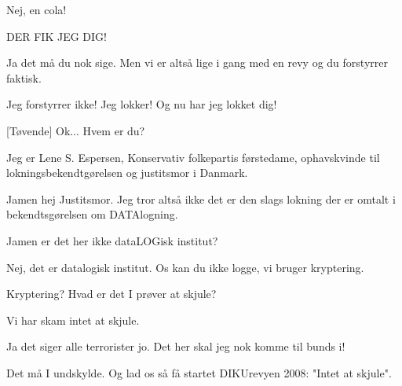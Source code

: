\documentclass[a4paper,11pt]{article}
\begin{document}
\begin{sketch}

 Nej, en cola! 


 DER FIK JEG DIG!

 Ja det må du nok sige. Men vi er altså lige i gang med en revy og du forstyrrer faktisk.

 Jeg forstyrrer ikke! Jeg lokker! Og nu har jeg lokket dig! 

[Tøvende] Ok... Hvem er du?

 Jeg er Lene S. Espersen, Konservativ folkepartis førstedame, ophavskvinde til lokningsbekendtgørelsen og 
justitsmor i Danmark.

 Jamen hej Justitsmor. Jeg tror altså ikke det er den slags lokning der er omtalt i bekendtsgørelsen om 
DATAlogning. 

 Jamen er det her ikke dataLOGisk institut?

 Nej, det er datalogisk institut. Os kan du ikke logge, vi bruger kryptering.

 Kryptering? Hvad er det I prøver at skjule?

 Vi har skam intet at skjule.

 Ja det siger alle terrorister jo. Det her skal jeg nok komme til bunds i!


 Det må I undskylde. Og lad os så få startet DIKUrevyen 2008: "Intet at skjule".


\end{sketch}
\end{document}
